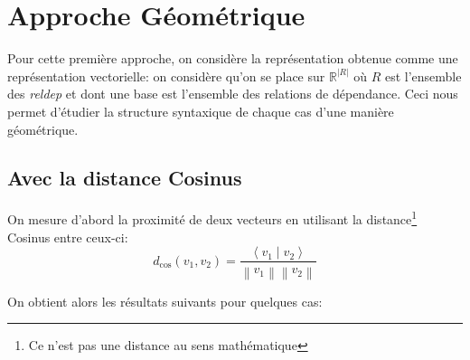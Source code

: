\documentclass{article}
\newcommand{\norm}[1]{\left\lVert #1 \right\rVert}
\newcommand{\abs}[1]{\left|#1\right|}
\newcommand{\scalar}[1]{\left\langle #1 \right\rangle}
\newcommand{\R}{\mathbb{R}}
\begin{document}
\section{Approche Géométrique}\label{sec:géométrie}
Pour cette première approche, on considère la représentation obtenue comme une représentation vectorielle: on considère qu'on se place sur $\R^{\abs{R}}$ où $R$ est l'ensemble des \textit{reldep} et dont une base est l'ensemble des relations de dépendance.
Ceci nous permet d'étudier la structure syntaxique de chaque cas d'une manière géométrique.

\subsection{Avec la distance Cosinus}\label{subsec:cosinus}
On mesure d'abord la proximité de deux vecteurs en utilisant la distance\footnote{Ce n'est pas une distance au sens mathématique} Cosinus entre ceux-ci:
\begin{equation}
        d_{\cos}(v_{1},v_{2}) = \frac{\scalar{v_{1}\mid v_{2}}}{\norm{v_{1}}\norm{v_{2}}}
\end{equation}

On obtient alors les résultats suivants pour quelques cas:

\renewcommand{\arraystretch}{1.1}
\begin{table}[h]
        \centering
        \caption{Proximities for Case=Gen}
\end{table}
\end{document}
